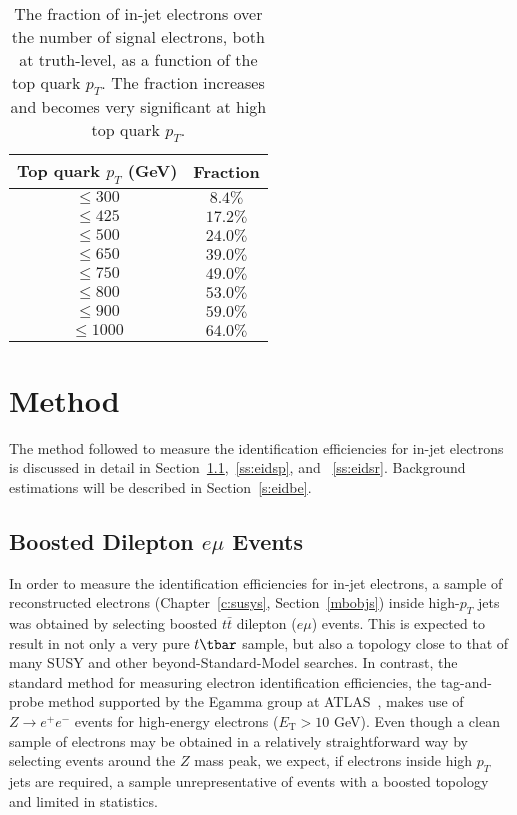 \renewcommand{\arraystretch}{1.15}
\begin{table}
	\centering
	\begin{tabular}{||c c||}
		\hline
		Top quark $p_T$ (GeV) & Fraction  \\ [0.5ex]
		\hline\hline
		\toprule
		$\leq 300$            & $ 8.4\%$  \\
		\hline
		$\leq 425$            & $ 17.2\%$ \\
		\hline
		$\leq 500$            & $ 24.0\%$ \\
		\hline
		$ \leq 650$           & $ 39.0\%$ \\
		\hline
		$ \leq 750$           & $ 49.0\%$ \\
		\hline
		$ \leq 800$           & $ 53.0\%$ \\
		\hline
		$ \leq 900$           & $ 59.0\%$ \\
		\hline
		$ \leq 1000$          & $ 64.0\%$ \\
		\hline
	\end{tabular}

	\caption{The fraction of in-jet electrons over the number of signal
		electrons, both at truth-level, as a function of the top quark $p_T$. The
		fraction increases and becomes very significant at high top quark $p_T$.}

	\label{t:injetfraction}
\end{table}
\renewcommand{\arraystretch}{1.0}




\section{Method}\label{s:eidmet}

The method followed to measure the identification efficiencies for in-jet
electrons is discussed in detail in Section~\ref{ss:eidtp},~\ref{ss:eidsp}, and
~\ref{ss:eidsr}. Background estimations will be described in
Section~\ref{s:eidbe}.

\subsection{Boosted Dilepton $e\mu$ Events}\label{ss:eidtp}

In order to measure the identification efficiencies for in-jet electrons, a
sample of reconstructed electrons (Chapter~\ref{c:susys}, Section~\ref{mbobjs})
inside high-$p_T$ jets was obtained by selecting boosted $t\bar{t}$ dilepton
($e\mu$) events. This is expected to result in not only a very pure $t\tbar$
sample, but also a topology close to that of many SUSY and other
beyond-Standard-Model searches. In contrast, the standard method for measuring
electron identification efficiencies, the tag-and-probe method supported by the
Egamma group at ATLAS~\cite{eleffme}, makes use of $Z\to e^+e^-$ events for
high-energy electrons ($E_{\text{T}} > 10$ GeV). Even though a clean sample of
electrons may be obtained in a relatively straightforward way by selecting
events around the $Z$ mass peak, we expect, if electrons inside high $p_T$ jets
are required, a sample unrepresentative of events with a boosted topology and
limited in statistics.

